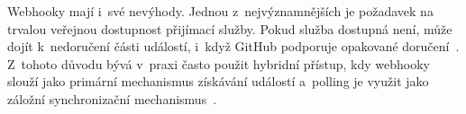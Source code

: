 Webhooky mají i~své nevýhody. Jednou z~nejvýznamnějších je požadavek na trvalou veřejnou dostupnost přijímací služby. Pokud služba dostupná není, může dojít k~nedoručení části událostí, i~když GitHub podporuje opakované doručení~\cite{github_webhooks}. Z~tohoto důvodu bývá v~praxi často použit hybridní přístup, kdy webhooky slouží jako primární mechanismus získávání událostí a~polling je využit jako záložní synchronizační mechanismus~\cite{github_webhooks,github_rest_api}.
